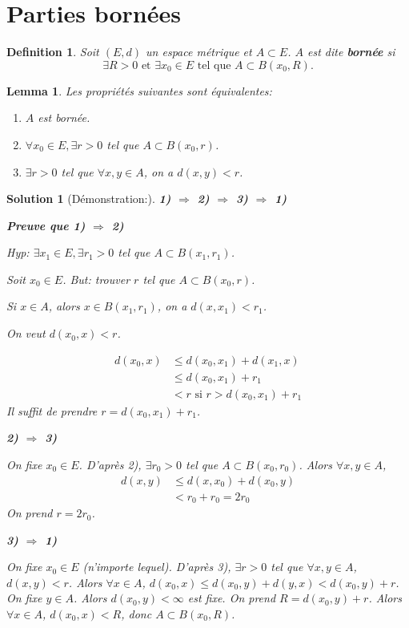 \documentclass{article}
\newtheorem{lemma}{Lemma}
\newtheorem{definition}{Definition}
\newtheorem{solution}{Solution}
\begin{document}
\section{Parties bornées}

\begin{definition}
Soit $(E, d)$ un espace métrique et $A \subset E$. $A$ est dite \textbf{bornée} si
\[
\exists R > 0 \text{ et } \exists x_0 \in E \text{ tel que } A \subset B(x_0, R).
\]
\end{definition}

\begin{lemma}
Les propriétés suivantes sont équivalentes:
\begin{enumerate}
    \item $A$ est bornée.
    \item $\forall x_0 \in E, \exists r > 0$ tel que $A \subset B(x_0, r)$.
    \item $\exists r > 0$ tel que $\forall x, y \in A$, on a $d(x, y) < r$.
\end{enumerate}
\end{lemma}

\begin{solution}
[Démonstration:]
\textbf{1) $\Rightarrow$ 2) $\Rightarrow$ 3) $\Rightarrow$ 1)}

\textbf{Preuve que 1) $\Rightarrow$ 2)}

Hyp: $\exists x_1 \in E, \exists r_1 > 0$ tel que $A \subset B(x_1, r_1)$.

Soit $x_0 \in E$. But: trouver $r$ tel que $A \subset B(x_0, r)$.

Si $x \in A$, alors $x \in B(x_1, r_1)$, on a $d(x, x_1) < r_1$.

On veut $d(x_0, x) < r$.

\begin{align*}
    d(x_0, x) &\leq d(x_0, x_1) + d(x_1, x) \\
              &\leq d(x_0, x_1) + r_1 \\
              &< r \text{ si } r > d(x_0, x_1) + r_1
\end{align*}
Il suffit de prendre $r = d(x_0, x_1) + r_1$.

\textbf{2) $\Rightarrow$ 3)}

On fixe $x_0 \in E$. D'après 2), $\exists r_0 > 0$ tel que $A \subset B(x_0, r_0)$.
Alors $\forall x, y \in A$,
\begin{align*}
    d(x, y) &\leq d(x, x_0) + d(x_0, y) \\
              &< r_0 + r_0 = 2r_0
\end{align*}
On prend $r = 2r_0$.

\textbf{3) $\Rightarrow$ 1)}

On fixe $x_0 \in E$ (n'importe lequel). D'après 3), $\exists r > 0$ tel que $\forall x, y \in A$, $d(x, y) < r$.
Alors $\forall x \in A$, $d(x_0, x) \leq d(x_0, y) + d(y, x) < d(x_0, y) + r$.
On fixe $y \in A$. Alors $d(x_0, y) < \infty$ est fixe. On prend $R = d(x_0, y) + r$.
Alors $\forall x \in A$, $d(x_0, x) < R$, donc $A \subset B(x_0, R)$.
\end{solution}
\end{document}
